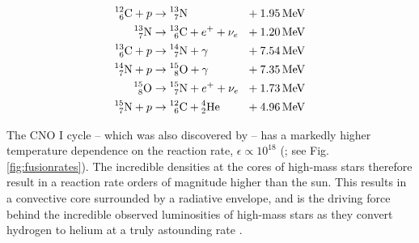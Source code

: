 \begin{equation}
  \begin{alignedat}{3}
    \prescript{12}{6}{\text C} + p & \rightarrow \prescript{13}{7}{\text N} && ~~ + \SI{1.95}{\mega\electronvolt} \\ 
    \prescript{13}{7}{\text N} & \rightarrow \prescript{13}{6}{\text C} + e^+ + \nu_e && ~~ + \SI{1.20}{\mega\electronvolt} \\
    \prescript{13}{6}{\text C} + p & \rightarrow \prescript{14}{7}{\text N} + \gamma && ~~ + \SI{7.54}{\mega\electronvolt} \\
    \prescript{14}{7}{\text N} + p & \rightarrow \prescript{15}{8}{\text O} + \gamma && ~~ + \SI{7.35}{\mega\electronvolt} \\
    \prescript{15}{8}{\text O} & \rightarrow \prescript{15}{7}{\text N} + e^+ + \nu_e && ~~ + \SI{1.73}{\mega\electronvolt} \\
    \prescript{15}{7}{\text N} + p & \rightarrow \prescript{12}{6}{\text C} + \prescript{4}{2}{\text {He}} && ~~ + \SI{4.96}{\mega\electronvolt}
  \end{alignedat}
\end{equation}

\noindent
The CNO I cycle -- which was also discovered by \textcite{betheEnergyProductionStars1939} -- has a markedly higher temperature dependence on the reaction rate, $\epsilon \propto 10^{18}$
(\cite[Ch.~10]{wongIntroductoryNuclearPhysics1998}; see Fig. \ref{fig:fusionrates}).
The incredible densities at the cores of high-mass stars therefore result in a reaction rate orders of magnitude higher than the sun.
This results in a convective core surrounded by a radiative envelope, and is the driving force behind the incredible observed luminosities of high-mass stars as they convert hydrogen to helium at a truly astounding rate \parencite[Ch.~5]{salarisEvolutionStarsStellar2005}.

